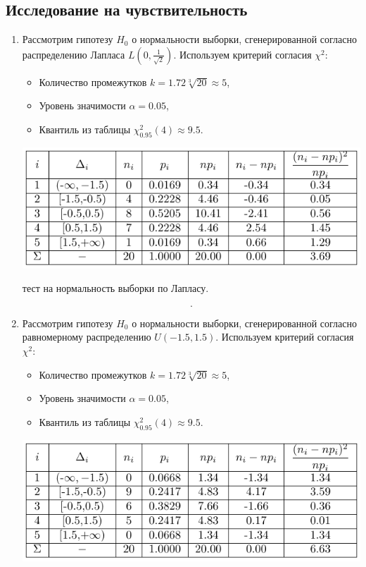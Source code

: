 \documentclass[a4paper]{article}
\begin{document}
\subsection*{Исследование на чувствительность}
\begin{enumerate}
    \item Рассмотрим гипотезу $H_0$ о нормальности выборки, сгенерированной согласно распределению Лапласа $L(0,\frac{1}{\sqrt{2}})$. Используем критерий согласия $\chi^2$:
    \begin{itemize}
    \item Количество промежутков $k=1.72\sqrt[3]{20}\approx5$,
    \item Уровень значимости $\alpha=0.05$,
    \item Квантиль из таблицы $\chi^2_{0.95}(4)\approx 9.5$.
\end{itemize}
\begin{table}[H]
    \centering
    \includegraphics[]{LabSrcs/resources/chi2testLaplace.pdf}
    \caption{тест на нормальность выборки по Лапласу.}
    \label{tab:chi2lapl}
\end{table}
\begin{equation*}
    .
\end{equation*}
\item Рассмотрим гипотезу $H_0$ о нормальности выборки, сгенерированной согласно равномерному распределению $U(-1.5,1.5)$. Используем критерий согласия $\chi^2$:
    \begin{itemize}
    \item Количество промежутков $k=1.72\sqrt[3]{20}\approx5$,
    \item Уровень значимости $\alpha=0.05$,
    \item Квантиль из таблицы $\chi^2_{0.95}(4)\approx 9.5$.
\end{itemize}
\begin{table}[H]
    \centering
    \includegraphics[]{LabSrcs/resources/chi2testUnif.pdf}

\end{table}
\end{enumerate}
\end{document}
